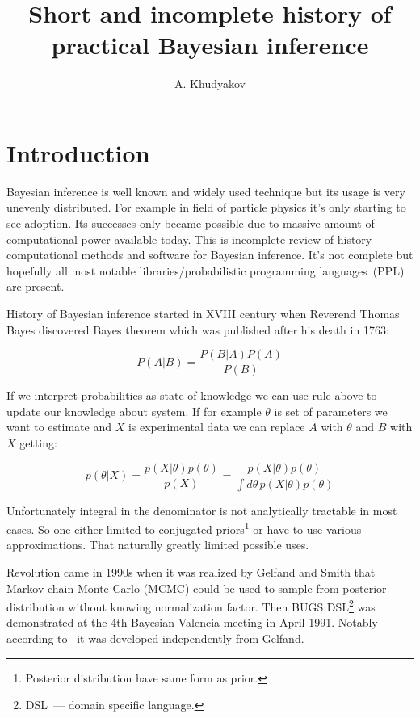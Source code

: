 \documentclass[a4paper]{article}
\author{A. Khudyakov}
\title{Short and incomplete history of practical Bayesian inference}
\begin{document}
\maketitle

\section{Introduction}

Bayesian inference is well known and widely used technique but its usage is very
unevenly distributed. For example in field of particle physics it's only
starting to see adoption. Its successes only became possible due to massive
amount of computational power available today. This is incomplete review of
history computational methods and software for Bayesian inference. It's not
complete but hopefully all most notable libraries/probabilistic programming
languages~(PPL) are present.

History of Bayesian inference started in XVIII century when Reverend Thomas
Bayes discovered Bayes theorem which was published after his death in 1763:

\begin{equation}
  P(A|B) = \frac{ P(B|A)P(A) }{ P(B) }
\end{equation}

If we interpret probabilities as state of knowledge we can use rule above to
update our knowledge about system. If for example $\theta$ is set of parameters
we want to estimate and $X$ is experimental data we can replace $A$ with
$\theta$ and $B$ with $X$ getting:

\begin{equation}
  p(\theta|X)
  = \frac{p(X|\theta)p(\theta)}{p(X)}
  = \frac{p(X|\theta)p(\theta)}{\int d\theta\, p(X|\theta)p(\theta)}
\end{equation}

Unfortunately integral in the denominator is not analytically tractable in most
cases. So one either limited to conjugated priors\footnote{Posterior
  distribution have same form as prior.} or have to use various
approximations. That naturally greatly limited possible uses.

Revolution came in 1990s when it was realized by Gelfand and
Smith\cite{gelfand1990sampling} that Markov chain Monte Carlo (MCMC) could be
used to sample from posterior distribution without knowing normalization factor.
Then BUGS\cite{gilks1994language} DSL\footnote{DSL~--- domain specific
  language.} was demonstrated at the 4th Bayesian Valencia meeting in April
1991. Notably according to~\cite{lunn2009bugs} it was developed independently
from Gelfand.
\end{document}
